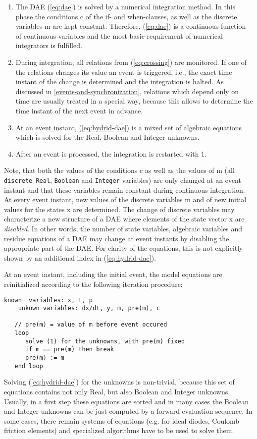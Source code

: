 \begin{enumerate}
\item
  The DAE (\ref{eq:dae}) is solved by a numerical integration method. In this
  phase the conditions c of the if- and when-clauses, as well as the
  discrete variables m are kept constant. Therefore, (\ref{eq:dae}) is a
  continuous function of continuous variables and the most basic
  requirement of numerical integrators is fulfilled.
\item
  During integration, all relations from (\ref{eq:crossing}) are monitored. If one of
  the relations changes its value an event is triggered, i.e., the exact
  time instant of the change is determined and the integration is
  halted. As discussed in \autoref{events-and-synchronization}, relations which depend only on
  time are usually treated in a special way, because this allows to
  determine the time instant of the next event in advance.
\item
  At an event instant, (\ref{eq:hydrid-dae}) is a mixed set of algebraic equations which
  is solved for the Real, Boolean and Integer unknowns.
\item
  After an event is processed, the integration is restarted with 1.
\end{enumerate}

Note, that both the values of the conditions c as well as the values of
m (all \lstinline[basicstyle=\ttfamily]!discrete Real!, \lstinline[basicstyle=\ttfamily]!Boolean! and \lstinline[basicstyle=\ttfamily]!Integer! variables) are only changed at
an event instant and that these variables remain constant during
continuous integration. At every event instant, new values of the
discrete variables m and of new initial values for the states x are
determined. The change of discrete variables may characterize a new
structure of a DAE where elements of the state vector x are
\emph{disabled}. In other words, the number of state variables,
algebraic variables and residue equations of a DAE may change at event
instants by disabling the appropriate part of the DAE. For clarity of
the equations, this is not explicitly shown by an additional index in
(\ref{eq:hydrid-dae}).

At an event instant, including the initial event, the model equations
are reinitialized according to the following iteration procedure:

\begin{lstlisting}[language=modelica]
    known  variables: x, t, p
    unkown variables: dx/dt, y, m, pre(m), c 

   // pre(m) = value of m before event occured
   loop
      solve (1) for the unknowns, with pre(m) fixed
      if m == pre(m) then break
      pre(m) := m    
   end loop 
\end{lstlisting}
Solving (\ref{eq:hydrid-dae}) for the unknowns is non-trivial, because this set of 
equations contains not only Real, but also Boolean and Integer unknowns.
Usually, in a first step these equations are sorted and in many cases
the Boolean and Integer unknowns can be just computed by a forward
evaluation sequence. In some cases, there remain systems of equations
(e.g. for ideal diodes, Coulomb friction elements) and specialized
algorithms have to be used to solve them.

